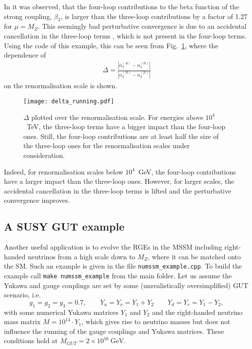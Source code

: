\documentclass[11pt,a4paper]{article}
\begin{document}
In \cite{Davies:2019onf} it was observed, that the four-loop contributions to the
beta function of the strong coupling, $\beta_3$, is larger than the three-loop contributions by a factor of 1.27 for $\mu = M_Z$. This seemingly bad perturbative convergence
is due to an accidental cancellation in the three-loop terms \cite{Davies:2019onf}, which is not present in the four-loop terms. Using the code of this example, this can be seen from Fig.~\ref{plt::delta}, where the dependence of
\begin{align}
\Delta = \frac{|\alpha_3^{(4l)} - \alpha_3^{(3l)}|}{|\alpha_3^{(3l)} - \alpha_3^{(2l)}|}
\end{align}
on the renormalisation scale is shown.
\begin{figure}
\centering
\texttt{[image: delta\_running.pdf]}
\caption{\label{plt::delta} $\Delta$ plotted over the renormalisation scale. For energies above $10^4$~TeV, the three-loop terms have a bigger impact than the four-loop ones. Still,
the four-loop contributions are at least half the size of the three-loop ones for the renormalisation scales under consideration.}
\end{figure}
Indeed, for renormalisation scales below $10^4$~GeV, the four-loop contributions have a larger impact than the three-loop ones. However, for larger scales,
the accidental cancellation in the three-loop terms is lifted and the perturbative convergence improves.

\subsection{\label{sec::mssm_example} A SUSY GUT example}
Another useful application is to evolve the RGEs in the MSSM including right-handed neutrinos from a high scale down to $M_Z$, where it can be matched onto the SM. Such an example is given in the file \texttt{numssm\_example.cpp}.
To build the example call \texttt{make numssm\_example} from the main folder.
Let us assume the Yukawa and gauge couplings are set by some (unrealistically oversimplified) GUT scenario, i.e.
\begin{equation}
g_1 = g_2 = g_3 = 0.7, \qquad Y_u = Y_\nu = Y_1 + Y_2 \qquad Y_d = Y_e = Y_1 - Y_2, 
\label{eq::GUT}
\end{equation}
with some numerical Yukawa matrices $Y_1$ and $Y_2$ and the right-handed neutrino mass matrix $M = 10^{14}\cdot Y_1$, which gives rise to neutrino masses but
does not influence the running of the gauge couplings and Yukawa matrices. These conditions hold at $M_{GUT} = 2\times 10^{16}\ \mathrm{GeV}$.
\end{document}
